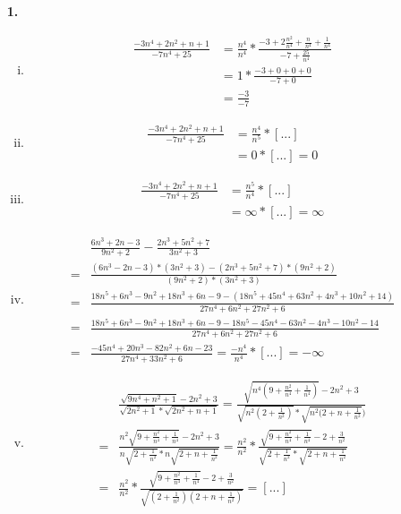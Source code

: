 \documentclass[a4paper]{scrartcl}
\title{\titleinfo}
\author{Elena Noll, Sven-Hendrik Haase, Arne Struck}
\date{\today}
\begin{document}
\maketitle

\begin{enumerate}
\item[\textbf{1.}]
\begin{enumerate}[(i)]

\item
\begin{align}
\frac {-3n^4+2n^2+n+1} {-7n^4+25} &= \frac {n^4} {n^4}* \frac {-3+2 \frac {n^2} {n^4} + \frac n {n^4} + \frac 1 {n^4}} {-7 + \frac {25} {n^4}} \\
								  &= 1* \frac {-3 + 0 + 0 + 0} {-7 + 0}\\
								  &= \frac {-3} {-7}
\end{align}

\item
\begin{align}
\frac {-3n^4+2n^2+n+1} {-7n^4+25} &= \frac {n^4} {n^5}* [...] \\
								  &= 0 * [...] = 0
\end{align}

\item
\begin{align}
\frac {-3n^4+2n^2+n+1} {-7n^4+25} &= \frac {n^5} {n^4}* [...] \\
								  &= \infty * [...] = \infty
\end{align}

\item
\begin{align}
& \frac {6n^3+2n-3} {9n^2+2} - \frac {2n^3+5n^2+7} {3n^2+3}\\
=& \frac {(6n^3-2n-3)*(3n^2+3)-(2n^3+5n^2+7)*(9n^2+2)} {(9n^2+2)*(3n^2+3)}\\
=& \frac {18n^5+6n^3-9n^2+18n^3+6n-9-(18n^5+45n^4+63n^2+4n^3+10n^2+14)} {27n^4+6n^2+27n^2+6}\\
=& \frac {18n^5+6n^3-9n^2+18n^3+6n-9-18n^5-45n^4-63n^2-4n^3-10n^2-14} {27n^4+6n^2+27n^2+6}\\
=& \frac {-45n^4+20n^3-82n^2+6n-23} {27n^4+33n^2+6} = \frac {-n^4} {n^4}*[...] = -\infty
\end{align}

\item
\begin{align}
&\frac {\sqrt{9n^4+n^2+1}-2n^2+3} {\sqrt{2n^2+1}*\sqrt{2n^2+n+1}}
=\frac {\sqrt{n^4(9+\frac {n^2} {n^4} + \frac 1 {n^4})}-2n^2+3} {\sqrt{n^2(2+\frac 1 {n^2})}*\sqrt{n^2(2+n+\frac 1 {n^2}})}\\
=&\frac {n^2\sqrt{9+\frac {n^2} {n^4} + \frac 1 {n^4}}-2n^2+3} {n\sqrt{2+\frac 1 {n^2}}*n\sqrt{2+n+\frac 1 {n^2}}}
=\frac {n^2} {n^2}*\frac {\sqrt{9+\frac {n^2} {n^4} + \frac 1 {n^4}}-2+\frac 3 {n^2}} {\sqrt{2+\frac 1 {n^2}}*\sqrt{2+n+\frac 1 {n^2}}}\\
=&\frac {n^2} {n^2}*\frac {\sqrt{9+\frac {n^2} {n^4} + \frac 1 {n^4}}-2+\frac 3 {n^2}} {\sqrt{(2+\frac 1 {n^2})(2+n+\frac 1 {n^2})}}
= [...]
\end{align}
\end{enumerate}


\end{enumerate}
\end{document}
